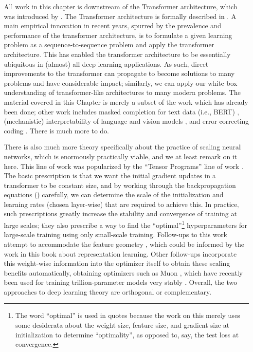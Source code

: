 \documentclass[../../book-main.tex]{subfiles}
\begin{document}
All work in this chapter is downstream of the Transformer architecture, which was introduced by \citet{vaswani2017attention}. The Transformer architecture is formally described in . A main empirical innovation in recent years, spurred by the prevalence and performance of the transformer architecture, is to formulate a given learning problem as a sequence-to-sequence problem and apply the transformer architecture. This has enabled the transformer architecture to be essentially ubiquitous in (almost) all deep learning applications. As such, direct improvements to the transformer can propagate to become solutions to many problems and have considerable impact; similarly, we can apply our white-box understanding of transformer-like architectures to many modern problems. The material covered in this Chapter is merely a subset of the work which has already been done; other work includes masked completion for text data (i.e., BERT) \citep{devlin2019bert,yu2024white}, (mechanistic) interpretability of language and vision models \citep{bai2024improving}, and error correcting coding \citep{zheng2025white}. There is much more to do.

There is also much more theory specifically about the practice of scaling neural networks, which is enormously practically viable, and we at least remark on it here. This line of work was popularized by the ``Tensor Programs'' line of work \citep{yang2022tensor}. The basic prescription is that we want the initial gradient updates in a transformer to be constant size, and by working through the backpropagation equations () carefully, we can determine the scale of the initialization and learning rates (chosen layer-wise) that are required to achieve this. In practice, such prescriptions greatly increase the stability and convergence of training at large scales; they also prescribe a way to find the ``optimal''\footnote{The word ``optimal'' is used in quotes because the work on this merely uses some desiderata about the weight size, feature size, and gradient size at initialization to determine ``optimality'', as opposed to, say, the test loss at convergence.} hyperparameters for large-scale training using only small-scale training. Follow-ups to this work attempt to accommodate the feature geometry \citep{bernstein2024oldoptimizernewnorm}, which could be informed by the work in this book about representation learning. Other follow-ups incorporate this weight-wise information into the optimizer itself to obtain these scaling benefits automatically, obtaining optimizers such as Muon \citep{jordan6muon}, which have recently been used for training trillion-parameter models very stably \citep{moonshot2025kimi}. Overall, the two approaches to deep learning theory are orthogonal or complementary.
\end{document}
